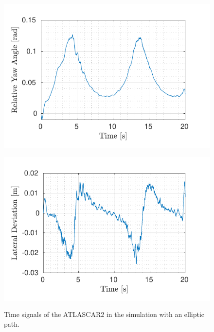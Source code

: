 \begin{figure}[!h]
\begin{minipage}[t]{0.49\textwidth}
		\includegraphics[width=\textwidth]{../../MATLAB/lane_following_circular_path/figure/RelativeYawAngleVsTime_circular.pdf}
		\label{fig:relative_yaw_angle_laneFollowing_circular}
	\end{minipage}
	\begin{minipage}[t]{0.49\textwidth}
		\includegraphics[width=\textwidth]{../../MATLAB/lane_following_circular_path/figure/LateralDeviationVsTime_circular.pdf}
		\label{fig:lateral_deviation_laneFollowing_circular}
	\end{minipage}
	\caption{Time signals of the ATLASCAR2 in the simulation with an elliptic path.}
	\label{fig:laneFollowing_signals_circular}
\end{figure}



